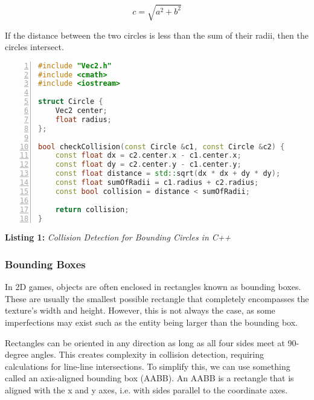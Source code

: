 \documentclass[10pt,a4paper]{article}
\begin{document}
\begin{equation}
    c = \sqrt{a^2 + b^2}
\end{equation}

If the distance between the two circles is less than the sum of their radii,
then the circles intersect.

\begin{mdframed}
    \vspace{1em}

    \begin{lstlisting}[language=C++, aboveskip=3mm,
        belowskip=3mm,
        showstringspaces=false,
        columns=flexible,
        basicstyle={\small\ttfamily},
        numbers=left,
        numberstyle=\tiny\color{gray},
        keywordstyle=\color{blue},
        commentstyle=\color{dkgreen},
        stringstyle=\color{mauve},
        breaklines=true,
        breakatwhitespace=true,
        tabsize=3,
        xleftmargin=1em]
#include "Vec2.h"
#include <cmath>
#include <iostream>

struct Circle {
    Vec2 center;
    float radius;
};

bool checkCollision(const Circle &c1, const Circle &c2) {
    const float dx = c2.center.x - c1.center.x;
    const float dy = c2.center.y - c1.center.y;
    const float distance = std::sqrt(dx * dx + dy * dy);
    const float sumOfRadii = c1.radius + c2.radius;
    const bool collision = distance < sumOfRadii;

    return collision;
}
\end{lstlisting}

\end{mdframed}

\begin{center}
    \textbf{Listing 1:} \textit{Collision Detection for Bounding Circles in C++}
\end{center}

\subsubsection{Bounding Boxes}
In 2D games, objects are often enclosed in rectangles known as bounding boxes.
These are usually the smallest possible rectangle that completely encompasses
the texture's width and height. However, this is not always the case, as some
imperfections may exist such as the entity being larger than the bounding box.

Rectangles can be oriented in any direction as long as all four sides meet at
90-degree angles. This creates complexity in collision detection, requiring
calculations for line-line intersections. To simplify this, we can use
something called an axis-aligned bounding box (AABB). An AABB is a rectangle
that is aligned with the x and y axes, i.e. with sides parallel to the
coordinate axes.
\end{document}
